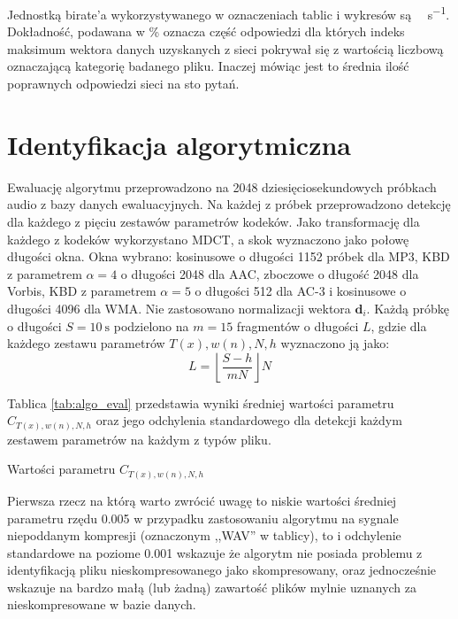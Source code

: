 \documentclass[pl,12pt]{aghdpl}
\let\Oldsection\section%
\renewcommand{\section}{\FloatBarrier\Oldsection}
\begin{document}
Jednostką birate'a wykorzystywanego w oznaczeniach tablic i wykresów są
\si{\kibi\bit\per\second}. Dokładność, podawana w \si{\percent} oznacza część
odpowiedzi dla których indeks maksimum wektora danych uzyskanych z sieci
pokrywał się z wartością liczbową oznaczającą kategorię badanego pliku. Inaczej
mówiąc jest to średnia ilość poprawnych odpowiedzi sieci na sto pytań.


\section{Identyfikacja algorytmiczna}
Ewaluację algorytmu przeprowadzono na 2048 dziesięciosekundowych próbkach audio
z bazy danych ewaluacyjnych. Na każdej z próbek przeprowadzono detekcję dla
każdego z pięciu zestawów parametrów kodeków. Jako transformację dla każdego z
kodeków wykorzystano MDCT, a skok wyznaczono jako połowę długości okna. Okna
wybrano: kosinusowe o długości 1152 próbek dla MP3, KBD z parametrem $\alpha =
4$ o długości 2048 dla AAC, zboczowe o długość 2048 dla Vorbis, KBD z
parametrem $\alpha = 5$ o długości 512 dla AC-3 i kosinusowe o długości 4096
dla WMA. Nie zastosowano normalizacji wektora $\bm d_i$. Każdą próbkę o
długości $S = \SI{10}{\second}$ podzielono na $m = 15$ fragmentów o długości
$L$, gdzie dla każdego zestawu parametrów $T(x),w(n),N,h$ wyznaczono ją jako:
\begin{equation}
  L = \left\lfloor\frac{S-h}{mN}\right\rfloor N
\end{equation}


Tablica \ref{tab:algo_eval} przedstawia wyniki średniej wartości parametru
$C_{T(x),w(n),N,h}$ oraz jego odchylenia standardowego dla detekcji każdym
zestawem parametrów na każdym z typów pliku.

\begin{table}[!tbh]
  \centering
  \caption{Wartości parametru $C_{T(x),w(n),N,h}$}
  
  \label{tab:algo_eval}
\end{table}

Pierwsza rzecz na którą warto zwrócić uwagę to niskie wartości średniej
parametru rzędu \num{0.005} w przypadku zastosowaniu algorytmu na sygnale
niepoddanym kompresji (oznaczonym ,,WAV'' w tablicy), to i odchylenie standardowe
na poziome \num{0.001} wskazuje że algorytm nie posiada problemu z
identyfikacją pliku nieskompresowanego jako skompresowany, oraz jednocześnie
wskazuje na bardzo małą (lub żadną) zawartość plików mylnie uznanych za
nieskompresowane w bazie danych. 
\end{document}
